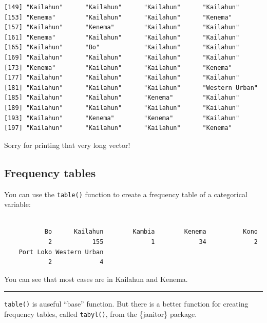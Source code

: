 \documentclass[
  letterpaper,
  DIV=11,
  numbers=noendperiod]{scrreprt}
\newenvironment{Shaded}{\begin{snugshade}}{\end{snugshade}}
\newcommand{\FunctionTok}[1]{\textcolor[rgb]{0.28,0.35,0.67}{#1}}
\newcommand{\NormalTok}[1]{\textcolor[rgb]{0.00,0.23,0.31}{#1}}
\newcommand{\SpecialCharTok}[1]{\textcolor[rgb]{0.37,0.37,0.37}{#1}}
\begin{document}
\begin{verbatim}
[149] "Kailahun"      "Kailahun"      "Kailahun"      "Kailahun"     
[153] "Kenema"        "Kailahun"      "Kailahun"      "Kenema"       
[157] "Kailahun"      "Kenema"        "Kailahun"      "Kailahun"     
[161] "Kenema"        "Kailahun"      "Kailahun"      "Kailahun"     
[165] "Kailahun"      "Bo"            "Kailahun"      "Kailahun"     
[169] "Kailahun"      "Kailahun"      "Kailahun"      "Kailahun"     
[173] "Kenema"        "Kailahun"      "Kailahun"      "Kenema"       
[177] "Kailahun"      "Kailahun"      "Kailahun"      "Kailahun"     
[181] "Kailahun"      "Kailahun"      "Kailahun"      "Western Urban"
[185] "Kailahun"      "Kailahun"      "Kenema"        "Kailahun"     
[189] "Kailahun"      "Kailahun"      "Kailahun"      "Kailahun"     
[193] "Kailahun"      "Kenema"        "Kenema"        "Kailahun"     
[197] "Kailahun"      "Kailahun"      "Kailahun"      "Kenema"       
\end{verbatim}

Sorry for printing that very long vector!

\hypertarget{frequency-tables}{%
\subsection{Frequency tables}\label{frequency-tables}}

You can use the \texttt{table()} function to create a frequency table of
a categorical variable:

\begin{Shaded}
\end{Shaded}

\begin{verbatim}

           Bo      Kailahun        Kambia        Kenema          Kono 
            2           155             1            34             2 
    Port Loko Western Urban 
            2             4 
\end{verbatim}

You can see that most cases are in Kailahun and Kenema.

\begin{center}\rule{0.5\linewidth}{0.5pt}\end{center}

\texttt{table()} is auseful ``base'' function. But there is a better
function for creating frequency tables, called \texttt{tabyl()}, from
the \{janitor\} package.
\end{document}

